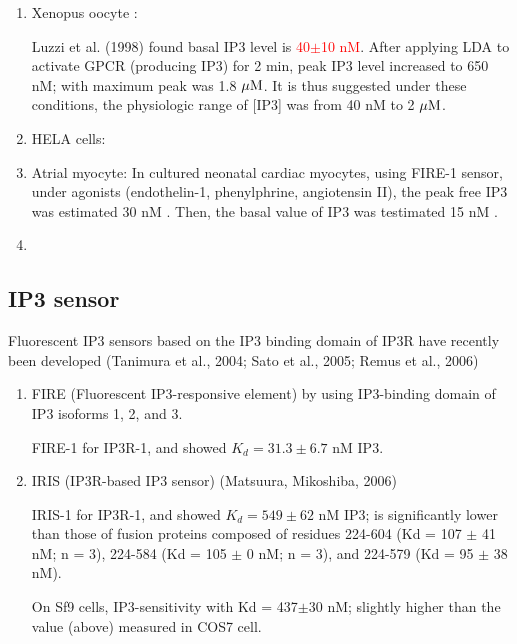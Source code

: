 \begin{enumerate}
  \item Xenopus oocyte :

Luzzi et al. (1998) found basal IP3 level is \textcolor{red}{40$\pm$10 nM}.
After applying LDA to activate GPCR (producing IP3) for 2 min, peak IP3 level
increased to 650 nM; with maximum peak was 1.8 ${\mu\text{M}}$. It is thus suggested
under these conditions, the physiologic range of [IP3] was from 40 nM to 2
${\mu\text{M}}$.

  
  \item HELA cells: 
  
  \item Atrial myocyte: 
  In cultured neonatal cardiac myocytes, using FIRE-1 sensor, under agonists
  (endothelin-1, phenylphrine, angiotensin II), the peak free IP3 was estimated
  30 nM \citep{remus2006ip3con}. Then, the basal value of
  IP3 was testimated 15 nM \citep{cooling2007mhip3}.


   \item 
\end{enumerate}

\subsection{IP3 sensor}
\label{sec:IP3-sensor}

Fluorescent IP3 sensors based on the IP3 binding domain of IP3R have recently
been developed (Tanimura et al., 2004; Sato et al., 2005; Remus et al., 2006)
\begin{enumerate}
  \item FIRE (Fluorescent IP3-responsive element) by using IP3-binding domain
  of IP3 isoforms 1, 2, and 3.  \citep{remus2006ip3con}

FIRE-1 for IP3R-1, and showed $K_d = 31.3 \pm 6.7$ nM IP3.
 
  \item IRIS (IP3R-based IP3 sensor) (Matsuura, Mikoshiba, 2006)

IRIS-1 for IP3R-1, and showed $K_d = 549 \pm 62$ nM IP3; is significantly lower
than those of fusion proteins composed of residues 224-604 (Kd = 107 $\pm$ 41 nM; n
= 3), 224-584 (Kd = 105 $\pm$ 0 nM; n = 3), and 224-579 (Kd = 95 $\pm$ 38 nM). 

On Sf9 cells, IP3-sensitivity with Kd = 437$\pm$30 nM; slightly higher than the
value (above) measured in COS7 cell.

\end{enumerate}


